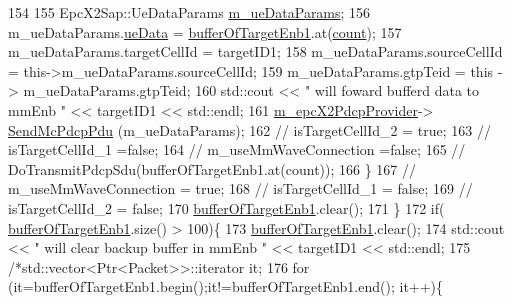 \begin{DoxyCode}
154 
155                                         EpcX2Sap::UeDataParams \hyperlink{classns3_1_1McEnbPdcp_a287dd059b2cafce7d6c4d4813ee79808}{m\_ueDataParams};
156                                         m\_ueDataParams.\hyperlink{structns3_1_1EpcX2Sap_1_1UeDataParams_aa194f663de494c1bf03bd42e51b81a8e}{ueData} =
      \hyperlink{classns3_1_1McEnbPdcp_a7418919c44f5c3aa473a040b5aeb2abc}{bufferOfTargetEnb1}.at(\hyperlink{classns3_1_1McEnbPdcp_abd1cb5ff8d1a5c8b5e3d241d1fbd5240}{count});
157                                         m\_ueDataParams.targetCellId = targetID1;
158                                         m\_ueDataParams.sourceCellId = this->m\_ueDataParams.sourceCellId;
159                                         m\_ueDataParams.gtpTeid = \textcolor{keyword}{this} -> m\_ueDataParams.gtpTeid;
160                                         std::cout << \textcolor{stringliteral}{" will foward bufferd data to mmEnb "} << targetID1 << 
      std::endl;
161                                         \hyperlink{classns3_1_1McEnbPdcp_aff328b08ea32259fd2859927a89d280f}{m\_epcX2PdcpProvider}->
      \hyperlink{classns3_1_1EpcX2PdcpProvider_a3e7d70dc42d16cc0f76758439a9c5b57}{SendMcPdcpPdu} (m\_ueDataParams);
162                                 \textcolor{comment}{//      isTargetCellId\_2 = true;}
163                                 \textcolor{comment}{//      isTargetCellId\_1 =false;}
164                         \textcolor{comment}{//              m\_useMmWaveConnection =false;}
165                         \textcolor{comment}{//              DoTransmitPdcpSdu(bufferOfTargetEnb1.at(count));}
166                                 \}
167                         \textcolor{comment}{//      m\_useMmWaveConnection = true;}
168                         \textcolor{comment}{//      isTargetCellId\_1 = false;}
169                         \textcolor{comment}{//      isTargetCellId\_2 = false;}
170                                 \hyperlink{classns3_1_1McEnbPdcp_a7418919c44f5c3aa473a040b5aeb2abc}{bufferOfTargetEnb1}.clear();
171         \}
172  \textcolor{keywordflow}{if}( \hyperlink{classns3_1_1McEnbPdcp_a7418919c44f5c3aa473a040b5aeb2abc}{bufferOfTargetEnb1}.size() > 100)\{
173                 \hyperlink{classns3_1_1McEnbPdcp_a7418919c44f5c3aa473a040b5aeb2abc}{bufferOfTargetEnb1}.clear();
174             std::cout << \textcolor{stringliteral}{" will clear backup buffer in mmEnb "} << targetID1 << std::endl;
175                 \textcolor{comment}{/*std::vector<Ptr<Packet>>::iterator it;}
176 \textcolor{comment}{                for (it=bufferOfTargetEnb1.begin();it!=bufferOfTargetEnb1.end(); it++)\{}

\end{DoxyCode}
